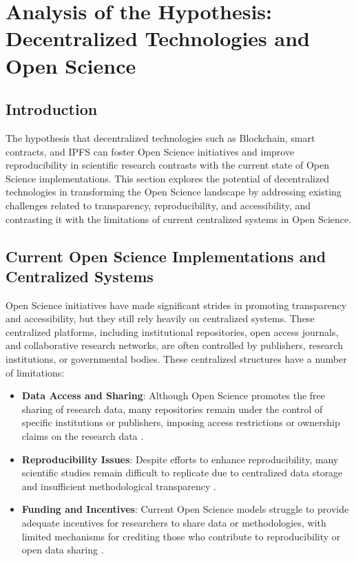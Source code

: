 \documentclass{article}
\begin{document}
\section{Analysis of the Hypothesis: Decentralized Technologies and Open Science}

\subsection{Introduction}
The hypothesis that decentralized technologies such as Blockchain, smart contracts, and IPFS can foster Open Science initiatives and improve reproducibility in scientific research contrasts with the current state of Open Science implementations. This section explores the potential of decentralized technologies in transforming the Open Science landscape by addressing existing challenges related to transparency, reproducibility, and accessibility, and contrasting it with the limitations of current centralized systems in Open Science.

\subsection{Current Open Science Implementations and Centralized Systems}
Open Science initiatives have made significant strides in promoting transparency and accessibility, but they still rely heavily on centralized systems. These centralized platforms, including institutional repositories, open access journals, and collaborative research networks, are often controlled by publishers, research institutions, or governmental bodies. These centralized structures have a number of limitations:
\begin{itemize}
    \item \textbf{Data Access and Sharing}: Although Open Science promotes the free sharing of research data, many repositories remain under the control of specific institutions or publishers, imposing access restrictions or ownership claims on the research data \cite{Boulton2015}.
    \item \textbf{Reproducibility Issues}: Despite efforts to enhance reproducibility, many scientific studies remain difficult to replicate due to centralized data storage and insufficient methodological transparency \cite{Borgman2012}.
    \item \textbf{Funding and Incentives}: Current Open Science models struggle to provide adequate incentives for researchers to share data or methodologies, with limited mechanisms for crediting those who contribute to reproducibility or open data sharing \cite{Nosek2015}.
\end{itemize}
\end{document}
